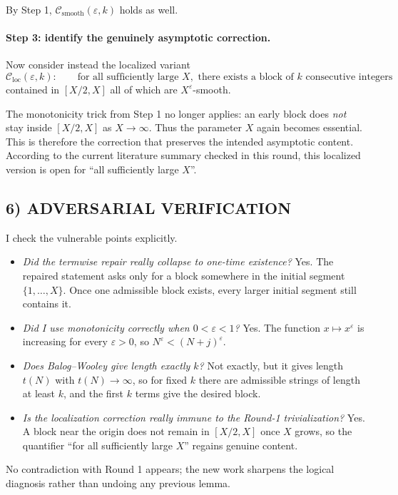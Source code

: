 By Step 1, $\mathcal C_{\mathrm{smooth}}(\varepsilon,k)$ holds as well.

\paragraph{Step 3: identify the genuinely asymptotic correction.}
Now consider instead the localized variant
\[
\mathcal C_{\mathrm{loc}}(\varepsilon,k):\qquad
\text{for all sufficiently large } X,\text{ there exists a block of } k \text{ consecutive integers }
\]
contained in $[X/2,X]$ all of which are $X^{\varepsilon}$-smooth.

The monotonicity trick from Step 1 no longer applies: an early block does \emph{not} stay inside $[X/2,X]$ as $X\to\infty$. Thus the parameter $X$ again becomes essential. This is therefore the correction that preserves the intended asymptotic content. According to the current literature summary checked in this round, this localized version is open for ``all sufficiently large $X$''.

\subsection*{6) ADVERSARIAL VERIFICATION}
I check the vulnerable points explicitly.
\begin{itemize}
\item \emph{Did the termwise repair really collapse to one-time existence?} Yes. The repaired statement asks only for a block somewhere in the initial segment $\{1,\ldots,X\}$. Once one admissible block exists, every larger initial segment still contains it.
\item \emph{Did I use monotonicity correctly when $0<\varepsilon<1$?} Yes. The function $x\mapsto x^{\varepsilon}$ is increasing for every $\varepsilon>0$, so $N^{\varepsilon}<(N+j)^{\varepsilon}$.
\item \emph{Does Balog--Wooley give length exactly $k$?} Not exactly, but it gives length $t(N)$ with $t(N)\to\infty$, so for fixed $k$ there are admissible strings of length at least $k$, and the first $k$ terms give the desired block.
\item \emph{Is the localization correction really immune to the Round-1 trivialization?} Yes. A block near the origin does not remain in $[X/2,X]$ once $X$ grows, so the quantifier ``for all sufficiently large $X$'' regains genuine content.
\end{itemize}
No contradiction with Round 1 appears; the new work sharpens the logical diagnosis rather than undoing any previous lemma.

